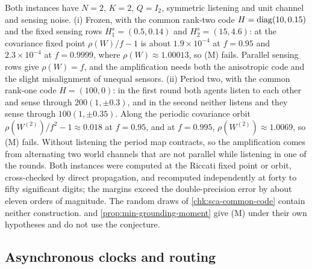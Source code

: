\begin{remark}\label{rem:sca-common-code-counterexamples}
Both instances have $N=2$, $K=2$, $Q=I_2$, symmetric listening and unit channel and sensing noise. (i) Frozen, with the common rank-two code $H=\operatorname{diag}(10,0.15)$ and the fixed sensing rows $H^s_1=(0.5,0.14)$ and $H^s_2=(15,4.6)$: at the covariance fixed point $\rho(W)/f-1$ is about $1.9\times10^{-4}$ at $f=0.95$ and $2.3\times10^{-4}$ at $f=0.9999$, where $\rho(W)\approx1.00013$, so \textup{(M)} fails. Parallel sensing rows give $\rho(W)=f$, and the amplification needs both the anisotropic code and the slight misalignment of unequal sensors. (ii) Period two, with the common rank-one code $H=(100,0)$: in the first round both agents listen to each other and sense through $200(1,\pm0.3)$, and in the second neither listens and they sense through $100(1,\pm0.35)$. Along the periodic covariance orbit $\rho(W^{(2)})/f^2-1\approx0.018$ at $f=0.95$, and at $f=0.995$, $\rho(W^{(2)})\approx1.0069$, so \textup{(M)} fails. Without listening the period map contracts, so the amplification comes from alternating two world channels that are not parallel while listening in one of the rounds. Both instances were computed at the Riccati fixed point or orbit, cross-checked by direct propagation, and recomputed independently at forty to fifty significant digits; the margins exceed the double-precision error by about eleven orders of magnitude. The random draws of \cref{chk:sca-common-code} contain neither construction.  and \cref{prop:min-grounding-moment} give \textup{(M)} under their own hypotheses and do not use the conjecture.
\end{remark}

\subsection{Asynchronous clocks and routing}\label{sup:sca-asynchronous-clocks-and-routing}

